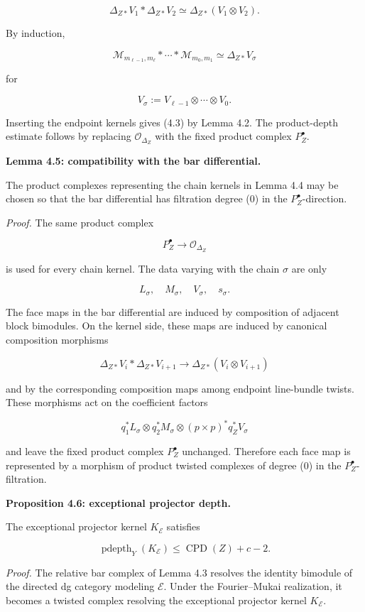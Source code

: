 \documentclass[11pt]{amsart}
\theoremstyle{definition}
\begin{document}
\[
\Delta_{Z*}V_1 * \Delta_{Z*}V_2
\simeq
\Delta_{Z*}(V_1\otimes V_2).
\]

By induction,

\[
\mathcal M_{m_{\ell-1},m_\ell}
*
\cdots
*
\mathcal M_{m_0,m_1}
\simeq
\Delta_{Z*}V_\sigma
\]

for

\[
V_\sigma:=V_{\ell-1}\otimes\cdots\otimes V_0.
\]

Inserting the endpoint kernels gives (4.3) by Lemma 4.2. The product-depth estimate follows by replacing $\mathcal O_{\Delta_Z}$ with the fixed product complex $P_Z^\bullet$.

\noindent\textbf{Lemma 4.5: compatibility with the bar differential.}

The product complexes representing the chain kernels in Lemma 4.4 may be chosen so that the bar differential has filtration degree (0) in the $P_Z^\bullet$-direction.

\noindent\emph{Proof.} The same product complex

\[
P_Z^\bullet\to \mathcal O_{\Delta_Z}
\]

is used for every chain kernel. The data varying with the chain $\sigma$ are only

\[
L_\sigma,\quad M_\sigma,\quad V_\sigma,\quad s_\sigma.
\]

The face maps in the bar differential are induced by composition of adjacent block bimodules. On the kernel side, these maps are induced by canonical composition morphisms

\[
\Delta_{Z*}V_i * \Delta_{Z*}V_{i+1}
\longrightarrow
\Delta_{Z*}(V_i\otimes V_{i+1})
\]

and by the corresponding composition maps among endpoint line-bundle twists. These morphisms act on the coefficient factors

\[
q_1^*L_\sigma
\otimes q_2^*M_\sigma
\otimes (p\times p)^*q_Z^*V_\sigma
\]

and leave the fixed product complex $P_Z^\bullet$ unchanged. Therefore each face map is represented by a morphism of product twisted complexes of degree (0) in the $P_Z^\bullet$-filtration.

\noindent\textbf{Proposition 4.6: exceptional projector depth.}

The exceptional projector kernel $K_{\mathcal E}$ satisfies

\[
\operatorname{pdepth}_Y(K_{\mathcal E})
\le
\operatorname{CPD}(Z)+c-2.
\]

\noindent\emph{Proof.} The relative bar complex of Lemma 4.3 resolves the identity bimodule of the directed dg category modeling $\mathcal E$. Under the Fourier--Mukai realization, it becomes a twisted complex resolving the exceptional projector kernel $K_{\mathcal E}$.
\end{document}
